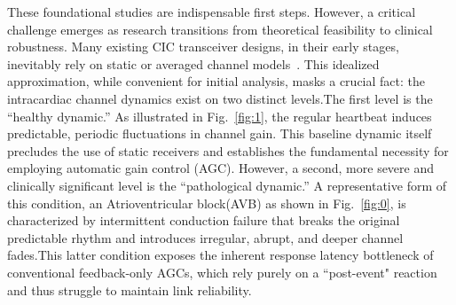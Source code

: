 \documentclass[journal]{IEEEtran}
\begin{document}
These foundational studies are indispensable first steps. However, a critical challenge emerges as research transitions from theoretical feasibility to clinical robustness. Many existing CIC transceiver designs, in their early stages, inevitably rely on static or averaged channel models~\cite{ryser2022modulation,bereuter2019leadless,khaleghi2020conductive}. This idealized approximation, while convenient for initial analysis, masks a crucial fact: the intracardiac channel dynamics exist on two distinct levels.The first level is the ``healthy dynamic.'' As illustrated in Fig.~\ref{fig:1}, the regular heartbeat induces predictable, periodic fluctuations in channel gain. This baseline dynamic itself precludes the use of static receivers and establishes the fundamental necessity for employing automatic gain control (AGC). However, a second, more severe and clinically significant level is the ``pathological dynamic.'' A representative form of this condition, an Atrioventricular block(AVB) as shown in Fig.~\ref{fig:0}, is characterized by intermittent conduction failure that breaks the original predictable rhythm and introduces irregular, abrupt, and deeper channel fades.This latter condition exposes the inherent response latency bottleneck of conventional feedback-only AGCs, which rely purely on a ``post-event" reaction and thus struggle to maintain link reliability.


\end{document}
